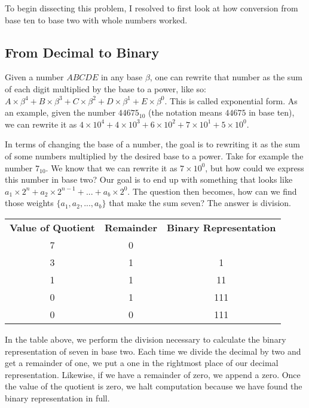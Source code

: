 \documentclass[12pt]{article}
\begin{document}
\par To begin dissecting this problem, I resolved to first look at how conversion from base ten to base two with whole numbers worked.

\subsection{From Decimal to Binary}
Given a number $ABCDE$ in any base $\beta$, one can rewrite that number as the sum of each digit multiplied by the base to a power, like so: $A\times\beta^4 + B\times\beta^3 + C\times\beta^2 + D\times\beta^1 + E\times\beta^0$. This is called exponential form. As an example, given the number $44675_{10}$ (the notation means $44675$ in base ten), we can rewrite it as $4\times10^4 + 4\times10^3 + 6\times10^2 + 7\times10^1 + 5\times10^0$.

\par In terms of changing the base of a number, the goal is to rewriting it as the sum of some numbers multiplied by the desired base to a power. Take for example the number $7_{10}$. We know that we can rewrite it as $7\times10^0$, but how could we express this number in base two? Our goal is to end up with something that looks like $a_1\times2^{n} + a_2\times2^{n-1} + ... + a_b\times2^0$. The question then becomes, how can we find those weights $\{a_1, a_2, ..., a_b\}$ that make the sum seven? The answer is division.

\begin{center}
\begin{tabular}{c|c|c}
  \textbf{Value of Quotient} & \textbf{Remainder} & \textbf{Binary Representation} \\
  7 & 0 & \\
  3 & 1 & 1 \\
  1 & 1 & 11 \\
  0 & 1 & 111 \\
  0 & 0 & 111
\end{tabular}
\end{center}

\par In the table above, we perform the division necessary to calculate the binary representation of seven in base two. Each time we divide the decimal by two and get a remainder of one, we put a one in the rightmost place of our decimal representation. Likewise, if we have a remainder of zero, we append a zero. Once the value of the quotient is zero, we halt computation because we have found the binary representation in full.
\end{document}
